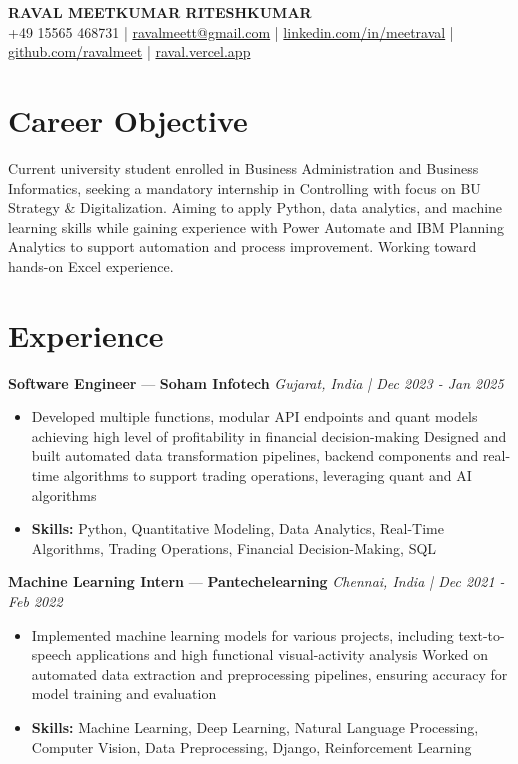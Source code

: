 \documentclass[a4paper,10pt]{article}
\begin{document}
\begin{center}
  {\Large\bfseries RAVAL MEETKUMAR RITESHKUMAR}\\[2pt]
  {\small +49 15565 468731 \;|\; \href{mailto:ravalmeett@gmail.com}{ravalmeett@gmail.com} \;|\; \href{https://www.linkedin.com/in/meetraval/}{linkedin.com/in/meetraval} \;|\; \href{https://github.com/ravalmeet}{github.com/ravalmeet} \;|\; \href{https://raval.vercel.app/}{raval.vercel.app}}
\end{center}
\vspace{-3pt}

\section*{Career Objective}
Current university student enrolled in Business Administration and Business Informatics, seeking a mandatory internship in Controlling with focus on BU Strategy \& Digitalization. Aiming to apply Python, data analytics, and machine learning skills while gaining experience with Power Automate and IBM Planning Analytics to support automation and process improvement. Working toward hands-on Excel experience.\par

\section*{Experience}
\textbf{Software Engineer} — \textbf{Soham Infotech} \hfill \textit{Gujarat, India \;|\; Dec 2023 - Jan 2025}\par
\vspace{1pt}
\begin{itemize}
  \item Developed multiple functions, modular API endpoints and quant models achieving high level of profitability in financial decision-making Designed and built automated data transformation pipelines, backend components and real-time algorithms to support trading operations, leveraging quant and AI algorithms
  \item \textbf{Skills:} Python, Quantitative Modeling, Data Analytics, Real-Time Algorithms, Trading Operations, Financial Decision-Making, SQL
\end{itemize}
\vspace{3pt}
\textbf{Machine Learning Intern} — \textbf{Pantechelearning} \hfill \textit{Chennai, India \;|\; Dec 2021 - Feb 2022}\par
\vspace{1pt}
\begin{itemize}
  \item Implemented machine learning models for various projects, including text-to-speech applications and high functional visual-activity analysis Worked on automated data extraction and preprocessing pipelines, ensuring accuracy for model training and evaluation
  \item \textbf{Skills:} Machine Learning, Deep Learning, Natural Language Processing, Computer Vision, Data Preprocessing, Django, Reinforcement Learning
\end{itemize}
\end{document}
